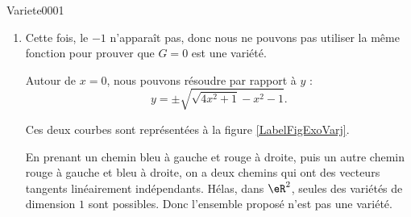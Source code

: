 \begin{corrige}{Variete0001}
\begin{enumerate}
		\item
			Cette fois, le $-1$ n'apparaît pas, donc nous ne pouvons pas utiliser la même fonction pour prouver que $G=0$ est une variété.

			Autour de $x=0$, nous pouvons résoudre par rapport à $y$ :
			\begin{equation}
				y=\pm\sqrt{  \sqrt{4x^2+1}-x^2-1   }.
			\end{equation}

			Ces deux courbes sont représentées à la figure \ref{LabelFigExoVarj}.	
			\newcommand{\CaptionFigExoVarj}{Ce à quoi ça ressemble. En bleu la partie sans le signe, et en rouge avec le signe moins.}
			

			En prenant un chemin bleu à gauche et rouge à droite, puis un autre chemin rouge à gauche et bleu à droite, on a deux chemins qui ont des vecteurs tangents linéairement indépendants. Hélas, dans $\eR^2$, seules des variétés de dimension $1$ sont possibles. Donc l'ensemble proposé n'est pas une variété.


	\end{enumerate}

\end{corrige}
